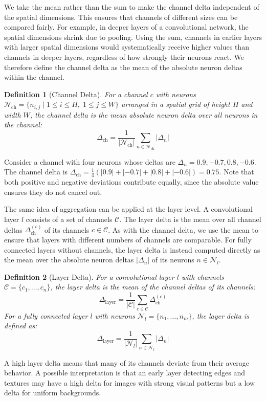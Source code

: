\documentclass[
12pt,
fancyheadings,
a4paper,
twoside,
BCOR=0.7cm,
nobcorignoretitle,
grayscalebody,
]{stsreprt}
\newtheorem{definition}{Definition}[chapter]
\begin{document}
We take the mean rather than the sum to make the channel delta independent of the spatial
dimensions.
This ensures that channels of different sizes can be compared fairly.
For example, in deeper layers of a convolutional network, the spatial dimensions shrink due to
pooling.
Using the sum, channels in earlier layers with larger spatial dimensions would systematically
receive higher values than channels in deeper layers, regardless of how strongly their neurons
react.
We therefore define the channel delta as the mean of the absolute neuron deltas within the channel.

\begin{definition}[Channel Delta]
For a channel $c$ with neurons $\mathcal{N}_{\text{ch}} = \{n_{i,j} \mid 1 \leq i \leq H,\; 1 \leq
j \leq W\}$ arranged in a spatial grid of height $H$ and width $W$, the \textit{channel delta} is
the mean absolute neuron delta over all neurons in the channel:
\begin{equation}
    \Delta_{\text{ch}} = \frac{1}{|\mathcal{N}_{\text{ch}}|} \sum_{n \in \mathcal{N}_{\text{ch}}} |\Delta_{n}|
\end{equation}
\end{definition}

Consider a channel with four neurons whose deltas are $\Delta_n = 0.9, -0.7, 0.8, -0.6$.
The channel delta is $\Delta_{\text{ch}} = \frac{1}{4}(|0.9| + |-0.7| + |0.8| + |-0.6|) = 0.75$.
Note that both positive and negative deviations contribute equally, since the absolute value
ensures they do not cancel out.

The same idea of aggregation can be applied at the layer level.
A convolutional layer $l$ consists of a set of channels $\mathcal{C}$.
The layer delta is the mean over all channel deltas $\Delta_{\text{ch}}^{(c)}$ of its channels $c
\in \mathcal{C}$.
As with the channel delta, we use the mean to ensure that layers with different numbers of channels
are comparable.
For fully connected layers without channels, the layer delta is instead computed directly as the
mean over the absolute neuron deltas $|\Delta_n|$ of its neurons $n \in \mathcal{N}_l$.

\begin{definition}[Layer Delta]
For a convolutional layer $l$ with channels $\mathcal{C} = \{c_1, \dots, c_n\}$, the \textit{layer
delta} is the mean of the channel deltas of its channels:
\begin{equation}
    \Delta_{\text{layer}} = \frac{1}{|\mathcal{C}|} \sum_{c \in \mathcal{C}} \Delta_{\text{ch}}^{(c)}
\end{equation}
For a fully connected layer $l$ with neurons $\mathcal{N}_l = \{n_1, \dots, n_m\}$, the layer delta
is defined as:
\begin{equation}
    \Delta_{\text{layer}} = \frac{1}{|\mathcal{N}_l|} \sum_{n \in \mathcal{N}_l} |\Delta_n|
\end{equation}
\end{definition}
A high layer delta means that many of its channels deviate from their average behavior.
A possible interpretation is that an early layer detecting edges and textures may have a high delta
for images with strong visual patterns but a low delta for uniform backgrounds.
\end{document}
